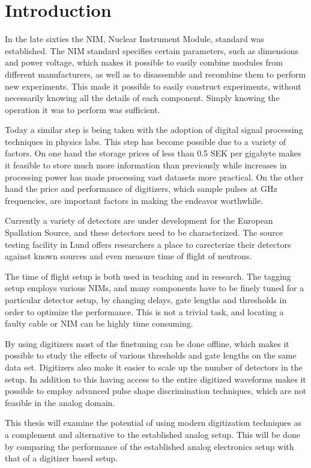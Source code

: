 \documentclass[main.tex]{subfiles}
\begin{document}
\chapter{Introduction}\label{ch:1}
In the late sixties the NIM, Nuclear Instrument Module, standard was established. The NIM standard specifies certain parameters, such as dimensions and power voltage, which makes it possible to easily combine modules from different manufacturers, as well as to disassemble and recombine them to perform new experiments. This made it possible to easily construct experiments, without necessarily knowing all the details of each component. Simply knowing the operation it was to perform was sufficient.

Today a similar step is being taken with the adoption of digital signal processing techniques in physics labs. This step has become possible due to a variety of factors. On one hand the storage prices of less than 0.5 SEK per gigabyte makes it feasible to store much more information than previously while increases in processing power has made processing vast datasets more practical. On the other hand the price and performance of digitizers, which sample pulses at GHz frequencies, are important factors in making the endeavor worthwhile.

Currently a variety of detectors are under development for the European Spallation Source, and these detectors need to be characterized. The source testing facility in Lund offers researchers a place to carecterize their detectors against known sources and even measure time of flight of neutrons. 

The time of flight setup is both used in teaching and in research. The tagging setup employs various NIMs, and many components have to be finely tuned for a particular detector setup, by changing delays, gate lengths and thresholds in order to optimize the performance. This is not a trivial task, and locating a faulty cable or NIM can be highly time consuming.

By using digitizers most of the finetuning can be done offline, which makes it possible to study the effects of various thresholds and gate lengths on the same data set. Digitizers also make it easier to scale up the number of detectors in the setup.
In addition to this having access to the entire digitized waveforms makes it possible to employ advanced pulse shape discrimination techniques, which are not feasible in the analog domain.

This thesis will examine the potential of using modern digitization techniques as a complement and alternative to the established analog setup. This will be done by comparing the performance of the established analog electronics setup with that of a digitizer based setup.
\end{document}
